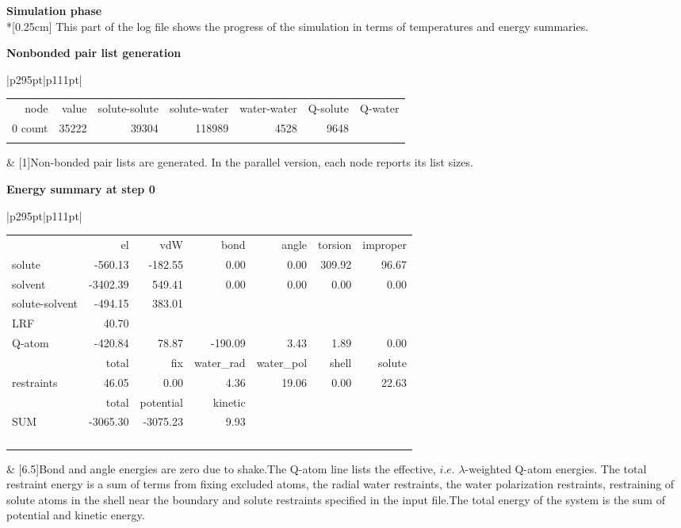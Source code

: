 \documentclass[a4paper,10pt]{article}
\begin{document}
\textbf{Simulation phase}\\*[0.25cm] This part of the log file
shows the progress of the simulation in terms of temperatures and
energy summaries.

\textbf{Nonbonded pair list generation}
\tiny
\vspace{-1\baselineskip}
\begin{longtable}{|p{295pt}|p{111pt}|}
\hline \begin{tabular}{rrrrrrr}node & value & solute-solute & solute-water & water-water & Q-solute & Q-water \\ 0 count & 35222 & 39304 & 118989 & 4528 & 9648\\&&&&&&\end{tabular} & [1\baselineskip]{Non-bonded pair lists are generated. In the parallel version, each node reports its list sizes.}\\
\hline
\end{longtable}
\normalsize
\textbf{Energy summary at step 0}
\tiny
\vspace{-1\baselineskip}
\begin{longtable}{|p{295pt}|p{111pt}|}
\hline \begin{tabular}{lrrrrrr} & el & vdW & bond & angle & torsion & improper\\solute & -560.13 & -182.55 & 0.00 & 0.00 & 309.92 & 96.67\\solvent & -3402.39 & 549.41 & 0.00 & 0.00 & 0.00 & 0.00\\solute-solvent & -494.15 & 383.01&&&&\\LRF & 40.70&&&&&\\Q-atom & -420.84 & 78.87 & -190.09 & 3.43 & 1.89 & 0.00 \\& total & fix & water\_rad & water\_pol & shell & solute\\restraints & 46.05 & 0.00 & 4.36 & 19.06 & 0.00 & 22.63 \\ & total & potential & kinetic&&&\\SUM & -3065.30 & -3075.23 & 9.93&&&\\&&&&&&\\&&&&&&\\&&&&&&\\&&&&&&\end{tabular} & [6.5\baselineskip]{Bond and angle energies are zero due to shake.The Q-atom line lists the effective, $i.e.$ $\lambda$-weighted Q-atom energies. The total restraint energy is a sum of terms from fixing excluded atoms, the radial water restraints, the water polarization restraints, restraining of solute atoms in the shell near the boundary and solute restraints specified in the input file.The total energy of the system is the sum of potential and kinetic energy.}\\
\hline
\end{longtable}
\end{document}
